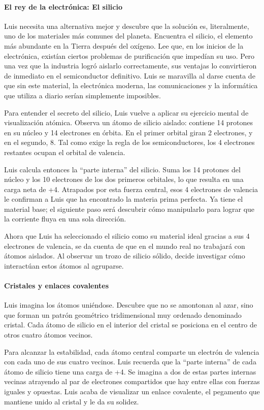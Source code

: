 \paragraph{El rey de la electrónica: El silicio}
Luis necesita una alternativa mejor y descubre que la solución es, literalmente, uno de los materiales más comunes del planeta. Encuentra el silicio, el elemento más abundante en la Tierra después del oxígeno. Lee que, en los inicios de la electrónica, existían ciertos problemas de purificación que impedían su uso. Pero una vez que la industria logró aislarlo correctamente, sus ventajas lo convirtieron de inmediato en el semiconductor definitivo. Luis se maravilla al darse cuenta de que sin este material, la electrónica moderna, las comunicaciones y la informática que utiliza a diario serían simplemente imposibles.

Para entender el secreto del silicio, Luis vuelve a aplicar su ejercicio mental de visualización atómica. Observa un átomo de silicio aislado: contiene 14 protones en su núcleo y 14 electrones en órbita. En el primer orbital giran 2 electrones, y en el segundo, 8. Tal como exige la regla de los semiconductores, los 4 electrones restantes ocupan el orbital de valencia.

Luis calcula entonces la ``parte interna'' del silicio. Suma los 14 protones del núcleo y los 10 electrones de los dos primeros orbitales, lo que resulta en una carga neta de +4. Atrapados por esta fuerza central, esos 4 electrones de valencia le confirman a Luis que ha encontrado la materia prima perfecta. Ya tiene el material base; el siguiente paso será descubrir cómo manipularlo para lograr que la corriente fluya en una sola dirección.

Ahora que Luis ha seleccionado el silicio como su material ideal gracias a sus 4 electrones de valencia, se da cuenta de que en el mundo real no trabajará con átomos aislados. Al observar un trozo de silicio sólido, decide investigar cómo interactúan estos átomos al agruparse.

\paragraph{Cristales y enlaces covalentes}
Luis imagina los átomos uniéndose. Descubre que no se amontonan al azar, sino que forman un patrón geométrico tridimensional muy ordenado denominado cristal. Cada átomo de silicio en el interior del cristal se posiciona en el centro de otros cuatro átomos vecinos.

Para alcanzar la estabilidad, cada átomo central comparte un electrón de valencia con cada uno de sus cuatro vecinos. Luis recuerda que la ``parte interna'' de cada átomo de silicio tiene una carga de +4. Se imagina a dos de estas partes internas vecinas atrayendo al par de electrones compartidos que hay entre ellas con fuerzas iguales y opuestas. Luis acaba de visualizar un enlace covalente, el pegamento que mantiene unido al cristal y le da su solidez.

